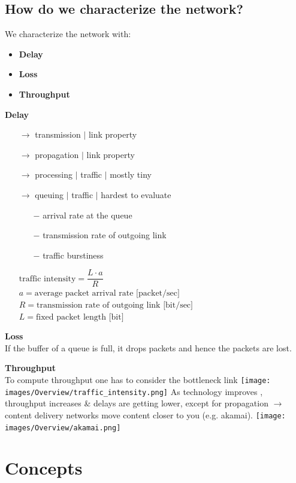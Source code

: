\documentclass[a4paper, fontsize=8pt, landscape, DIV=1]{scrartcl}
\begin{document}
\begin{multicols*}{4}
		\subsection{How do we characterize the network?}
		We characterize the network with:
		\begin{itemize}[noitemsep]
			\item \textbf{Delay}	
			\item \textbf{Loss}
			\item \textbf{Throughput} 
		\end{itemize}
		\textbf{Delay}
		\vspace{-0.2cm}
		\begin{itemize}[noitemsep]
			\item[$\rightarrow$] transmission $\vert$ link property
			\item[$\rightarrow$] propagation $\vert$ link property
			\item[$\rightarrow$] processing $\vert$ traffic $\vert$ mostly tiny
			\item[$\rightarrow$] queuing $\vert$ traffic $\vert$ hardest to evaluate
			\begin{itemize}
				\item[$-$] arrival rate at the queue
				\item[$-$] transmission rate of outgoing link
				\item[$-$] traffic burstiness 
			\end{itemize}
			$\text{traffic intensity} = \dfrac{L\cdot a}{R}$\\
			$a = \text{average packet arrival rate [packet/sec]} $\\
			$R = \text{transmission rate of outgoing link [bit/sec]} $\\
			$L = \text{fixed packet length [bit]} $	
		\end{itemize}
		\textbf{Loss}\\
		If the buffer of a queue is full, it drops packets and hence the packets are
		lost.\par
		\textbf{Throughput}\\
		To compute throughput one has to consider the bottleneck link
		\texttt{[image: images/Overview/traffic\_intensity.png]}
		As technology improves , throughput increases \& delays are getting lower,
		except for propagation $\rightarrow$ content delivery networks move content
		closer to you (e.g. akamai).
		\texttt{[image: images/Overview/akamai.png]}
		\newpage 
		
		\section{Concepts}

\end{multicols*}
\end{document}
